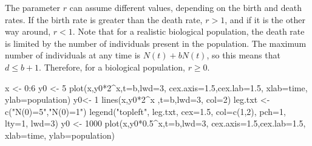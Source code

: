 \documentclass[
  letterpaper,
  DIV=11,
  numbers=noendperiod]{scrreprt}
\newenvironment{Shaded}{\begin{snugshade}}{\end{snugshade}}
\newcommand{\AttributeTok}[1]{\textcolor[rgb]{0.40,0.45,0.13}{#1}}
\newcommand{\DecValTok}[1]{\textcolor[rgb]{0.68,0.00,0.00}{#1}}
\newcommand{\FloatTok}[1]{\textcolor[rgb]{0.68,0.00,0.00}{#1}}
\newcommand{\FunctionTok}[1]{\textcolor[rgb]{0.28,0.35,0.67}{#1}}
\newcommand{\NormalTok}[1]{\textcolor[rgb]{0.00,0.23,0.31}{#1}}
\newcommand{\OtherTok}[1]{\textcolor[rgb]{0.00,0.23,0.31}{#1}}
\newcommand{\SpecialCharTok}[1]{\textcolor[rgb]{0.37,0.37,0.37}{#1}}
\newcommand{\StringTok}[1]{\textcolor[rgb]{0.13,0.47,0.30}{#1}}
\begin{document}
\label{sec:bio14}

The parameter \(r\) can assume different values, depending on the birth
and death rates. If the birth rate is greater than the death rate,
\(r > 1\), and if it is the other way around, \(r < 1\). Note that for a
realistic biological population, the death rate is limited by the number
of individuals present in the population. The maximum number of
individuals at any time is \(N(t)+bN(t)\), so this means that
\(d \leq b +1\). Therefore, for a biological population, \(r \geq 0\).

\begin{Shaded}
\begin{Highlighting}[]
\NormalTok{x }\OtherTok{\textless{}{-}} \DecValTok{0}\SpecialCharTok{:}\DecValTok{6}
\NormalTok{y0 }\OtherTok{\textless{}{-}} \DecValTok{5}
\FunctionTok{plot}\NormalTok{(x,y0}\SpecialCharTok{*}\DecValTok{2}\SpecialCharTok{\^{}}\NormalTok{x,}\AttributeTok{t=}\StringTok{\textquotesingle{}b\textquotesingle{}}\NormalTok{,}\AttributeTok{lwd=}\DecValTok{3}\NormalTok{, }\AttributeTok{cex.axis=}\FloatTok{1.5}\NormalTok{,}\AttributeTok{cex.lab=}\FloatTok{1.5}\NormalTok{, }\AttributeTok{xlab=}\StringTok{\textquotesingle{}time\textquotesingle{}}\NormalTok{, }\AttributeTok{ylab=}\StringTok{\textquotesingle{}population\textquotesingle{}}\NormalTok{)}
\NormalTok{y0}\OtherTok{\textless{}{-}} \DecValTok{1}
\FunctionTok{lines}\NormalTok{(x,y0}\SpecialCharTok{*}\DecValTok{2}\SpecialCharTok{\^{}}\NormalTok{x ,}\AttributeTok{t=}\StringTok{\textquotesingle{}b\textquotesingle{}}\NormalTok{,}\AttributeTok{lwd=}\DecValTok{3}\NormalTok{, }\AttributeTok{col=}\DecValTok{2}\NormalTok{)}
\NormalTok{leg.txt }\OtherTok{\textless{}{-}} \FunctionTok{c}\NormalTok{(}\StringTok{"N(0)=5"}\NormalTok{,}\StringTok{"N(0)=1"}\NormalTok{)}
\FunctionTok{legend}\NormalTok{(}\StringTok{"topleft"}\NormalTok{, leg.txt, }\AttributeTok{cex=}\FloatTok{1.5}\NormalTok{, }\AttributeTok{col=}\FunctionTok{c}\NormalTok{(}\DecValTok{1}\NormalTok{,}\DecValTok{2}\NormalTok{), }\AttributeTok{pch=}\DecValTok{1}\NormalTok{, }\AttributeTok{lty=}\DecValTok{1}\NormalTok{, }\AttributeTok{lwd=}\DecValTok{3}\NormalTok{)}
\NormalTok{y0 }\OtherTok{\textless{}{-}} \DecValTok{1000}
\FunctionTok{plot}\NormalTok{(x,y0}\SpecialCharTok{*}\FloatTok{0.5}\SpecialCharTok{\^{}}\NormalTok{x,}\AttributeTok{t=}\StringTok{\textquotesingle{}b\textquotesingle{}}\NormalTok{,}\AttributeTok{lwd=}\DecValTok{3}\NormalTok{, }\AttributeTok{cex.axis=}\FloatTok{1.5}\NormalTok{,}\AttributeTok{cex.lab=}\FloatTok{1.5}\NormalTok{, }\AttributeTok{xlab=}\StringTok{\textquotesingle{}time\textquotesingle{}}\NormalTok{, }\AttributeTok{ylab=}\StringTok{\textquotesingle{}population\textquotesingle{}}\NormalTok{)}

\end{Highlighting}
\end{Shaded}
\end{document}
